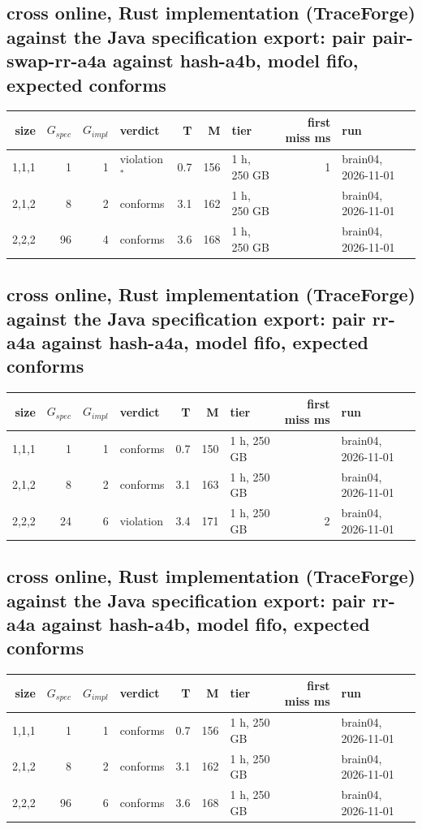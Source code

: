 \documentclass[10pt]{article}
\begin{document}
\subsection*{cross online, Rust implementation (TraceForge) against the Java specification export: pair \textsf{pair-swap-rr-a4a} against \textsf{hash-a4b}, model fifo, expected conforms}
\begin{longtable}{@{}rrrlrrlrl@{}}
\toprule
size & $G_{\mathit{spec}}$ & $G_{\mathit{impl}}$ & verdict & T & M & tier & first miss ms & run \\
\midrule
\endhead
\color{red} 1,1,1 & 1 & 1 & violation$^{\ast}$ & 0.7 & 156 & 1 h, 250 GB & 1 & brain04, 2026-11-01 \\
\color{red} 2,1,2 & 8 & 2 & conforms & 3.1 & 162 & 1 h, 250 GB &  & brain04, 2026-11-01 \\
\color{red} 2,2,2 & 96 & 4 & conforms & 3.6 & 168 & 1 h, 250 GB &  & brain04, 2026-11-01 \\
\bottomrule
\end{longtable}
\subsection*{cross online, Rust implementation (TraceForge) against the Java specification export: pair \textsf{rr-a4a} against \textsf{hash-a4a}, model fifo, expected conforms}
\begin{longtable}{@{}rrrlrrlrl@{}}
\toprule
size & $G_{\mathit{spec}}$ & $G_{\mathit{impl}}$ & verdict & T & M & tier & first miss ms & run \\
\midrule
\endhead
\color{red} 1,1,1 & 1 & 1 & conforms & 0.7 & 150 & 1 h, 250 GB &  & brain04, 2026-11-01 \\
\color{red} 2,1,2 & 8 & 2 & conforms & 3.1 & 163 & 1 h, 250 GB &  & brain04, 2026-11-01 \\
\color{red} 2,2,2 & 24 & 6 & violation & 3.4 & 171 & 1 h, 250 GB & 2 & brain04, 2026-11-01 \\
\bottomrule
\end{longtable}
\subsection*{cross online, Rust implementation (TraceForge) against the Java specification export: pair \textsf{rr-a4a} against \textsf{hash-a4b}, model fifo, expected conforms}
\begin{longtable}{@{}rrrlrrlrl@{}}
\toprule
size & $G_{\mathit{spec}}$ & $G_{\mathit{impl}}$ & verdict & T & M & tier & first miss ms & run \\
\midrule
\endhead
\color{red} 1,1,1 & 1 & 1 & conforms & 0.7 & 156 & 1 h, 250 GB &  & brain04, 2026-11-01 \\
\color{red} 2,1,2 & 8 & 2 & conforms & 3.1 & 162 & 1 h, 250 GB &  & brain04, 2026-11-01 \\
\color{red} 2,2,2 & 96 & 6 & conforms & 3.6 & 168 & 1 h, 250 GB &  & brain04, 2026-11-01 \\
\bottomrule
\end{longtable}
\end{document}
